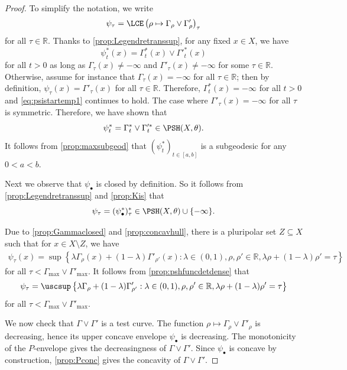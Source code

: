 \begin{proof}
    To simplify the notation, we write
    \[
    \psi_{\tau}=\LCE\left( \rho \mapsto \Gamma_{\rho}\lor \Gamma'_{\rho} \right)_{\tau}
    \]
    for all $\tau\in \mathbb{R}$. Thanks to \cref{prop:Legendretranssup}, for any fixed $x\in X$, we have
    \begin{equation}\label{eq:psistartemp1}
    \psi^*_t(x)=\Gamma^*_t(x)\lor \Gamma'^*_t(x)
    \end{equation}
    for all $t>0$ as long as $\Gamma_{\tau}(x)\neq -\infty$ and $\Gamma'_{\tau}(x)\neq -\infty$ for some $\tau\in \mathbb{R}$. Otherwise, assume for instance that $\Gamma_{\tau}(x)=-\infty$ for all $\tau\in \mathbb{R}$; then by definition, $\psi_{\tau}(x)=\Gamma'_{\tau}(x)$ for all $\tau\in \mathbb{R}$. Therefore, $\Gamma^*_t(x)=-\infty$ for all $t>0$ and \eqref{eq:psistartemp1} continues to hold. The case where $\Gamma'_{\tau}(x)=-\infty$ for all $\tau$ is symmetric. Therefore, we have shown that
    \[
    \psi^*_t=\Gamma^*_t\lor \Gamma'^*_t\in \PSH(X,\theta).
    \]
    It follows from \cref{prop:maxsubgeod} that $(\psi^*_t)_{t\in [a,b]}$ is a subgeodesic for any $0< a<b$.

    Next we observe that $\psi_{\bullet}$ is closed by definition. So it follows from \cref{prop:Legendretranssup} and \cref{prop:Kis} that
    \[
    \psi_{\tau}=(\psi^*_{\bullet})^*_{\tau}\in \PSH(X,\theta)\cup \{-\infty\}.
    \]

    Due to \cref{prop:Gammaclosed} and \cref{prop:concavhull}, there is a pluripolar set $Z\subseteq X$ such that for $x\in X\setminus Z$, we have
    \[
    \begin{split}
    \psi_{\tau}(x)=\sup\left\{\lambda \Gamma_{\rho}(x)+(1-\lambda)\Gamma'_{\rho'}(x): \lambda \in (0,1),\rho,\rho'\in \mathbb{R},\lambda\rho+(1-\lambda)\rho'=\tau\right\}
    \end{split}
    \]
    for all $\tau<\Gamma_{\max}\lor \Gamma'_{\max}$. It follows from \cref{prop:pshfuncdetdense} that
    \begin{equation}\label{eq:psitausupslineartemp}
    \begin{split}
    \psi_{\tau}=\uscsup \left\{\lambda \Gamma_{\rho}+(1-\lambda)\Gamma'_{\rho'}: \lambda \in (0,1),\rho,\rho'\in \mathbb{R},\lambda\rho+(1-\lambda)\rho'=\tau \right\}
    \end{split}
    \end{equation}
    for all $\tau<\Gamma_{\max}\lor \Gamma'_{\max}$.

    We now check that $\Gamma\lor\Gamma'$ is a test curve. The function $\rho\mapsto\Gamma_\rho\lor\Gamma'_\rho$ is decreasing, hence its upper concave envelope $\psi_\bullet$ is decreasing. The monotonicity of the $P$-envelope  gives the decreasingness of $\Gamma\lor\Gamma'$. Since $\psi_\bullet$ is concave by construction, \cref{prop:Pconc} gives the concavity of $\Gamma\lor\Gamma'$.


\end{proof}
